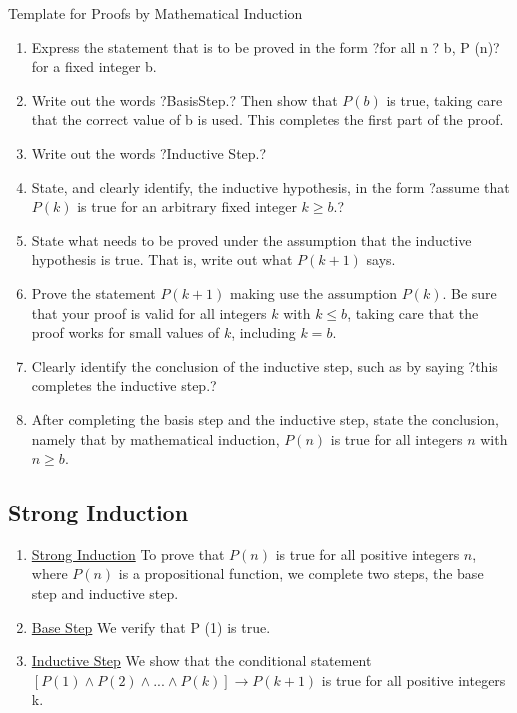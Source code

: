 \documentclass[12pt]{article}
\begin{document}
\pagebreak

Template for Proofs by Mathematical Induction

\begin{enumerate}
\item Express the statement that is to be proved in the form ?for all n ? b, P (n)? for a fixed integer b.
\item Write out the words ?BasisStep.? Then show that $P(b)$ is true, taking care that the correct value of b is used. This completes the first part of the proof.
\item Write out the words ?Inductive Step.?
\item State, and clearly identify, the inductive hypothesis, in the form ?assume that $P(k)$ is true for an arbitrary fixed integer $k \geq b$.?
\item State what needs to be proved under the assumption that the inductive hypothesis is true. That is, write out what $P(k + 1)$ says.
\item Prove the statement $P(k + 1)$ making use the assumption $P(k)$. Be sure that your proof is valid for all integers $k$ with $k \leq b$, taking care that the proof works for small values of $k$, including $k = b$.
\item Clearly identify the conclusion of the inductive step, such as by saying ?this completes the inductive step.?
\item After completing the basis step and the inductive step, state the conclusion, namely that by mathematical induction, $P(n)$ is true for all integers $n$ with $n \geq b$.
\end{enumerate}

\subsection{Strong Induction}

\begin{enumerate}
\item \underline{Strong Induction} To prove that $P(n)$ is true for all positive integers $n$, where $P(n)$ is a propositional function, we complete two steps, the base step and inductive step.
\item \underline{Base Step} We verify that P (1) is true.
\item \underline{Inductive Step} We show that the conditional statement $\left [ P (1) \wedge P(2) \wedge . . . \wedge P(k) \right ]\rightarrow P(k + 1)$ is true for all positive integers k.
\end{enumerate}
\end{document}
